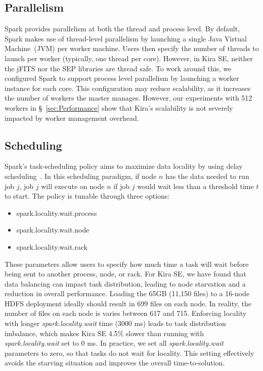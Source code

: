 \documentclass[10pt, conference, compsocconf]{IEEEtran}
\begin{document}
\subsection{Parallelism}

Spark provides parallelism at both the thread and process level. By default, Spark makes use of
thread-level parallelism by launching a single Java Virtual Machine~(JVM) per worker machine.
Users then specify the number of threads to launch per worker (typically, one thread per core).
However, in Kira SE, neither the jFITS nor the SEP libraries are thread safe. To work around this,
we configured Spark to support process level parallelism by launching a worker instance for each
core. This configuration may reduce scalability,
as it increases the number of workers the master manages. However, our experiments with 512
workers in \S~\ref{sec:Performance} show that Kira's scalability is not severely impacted by
worker management overhead.

\subsection{Scheduling}

Spark's task-scheduling policy aims to maximize data locality by using
delay scheduling~\cite{zaharia10ds}. In this scheduling paradigm, if node $n$ has the data needed
to run job $j$, job $j$ will execute on node $n$ if job $j$ would wait less than a threshold time
$t$ to start. The policy is tunable through three options:

\begin{itemize}
\item{spark.locality.wait.process}
\item{spark.locality.wait.node}
\item{spark.locality.wait.rack}
\end{itemize}

These parameters allow users to specify how much time a task will wait before being sent to another
process, node, or rack. For Kira SE, we have found that data balancing can 
impact task distribution, leading to node starvation and a reduction in overall performance.
Loading the 65GB (11,150 files) to a 16-node HDFS deployment ideally should result in 699 files on each node.
In reality, the number of files on each node is varies between 617 and 715.
Enforcing locality with longer {\em spark.locality.wait} time (3000 ms) leads to task distribution imbalance, which makes
Kira SE 4.5\% slower than running with {\em spark.locality.wait} set to 0 ms.
In practice, we set all {\em spark.locality.wait} parameters to zero, so that tasks do not wait for locality.
This setting effectively avoids the starving situation and improves the overall time-to-solution.
\end{document}
